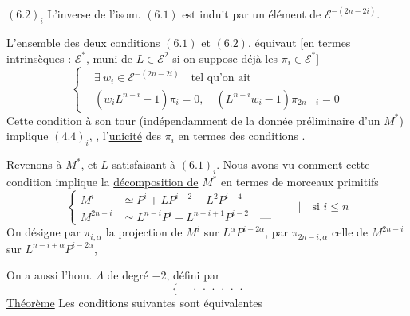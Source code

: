 $(6.2)_i$ L'inverse de l'isom. $(6.1)$ est  induit par un élément de $\mathcal E^{-(2n-2i)}$.

 L'ensemble des deux conditions $(6.1)$ et $(6.2)$, équivaut [en termes intrinsèques : $\mathcal E^*$, muni de $L\in\mathcal E^2$ si on suppose déjà les $\pi_i\in\mathcal E^*$]
\[
\left\{\begin{aligned}
&\exists\ w_i\in\mathcal E^{-(2n-2i)}\quad\text{tel qu'on ait}\\
&(w_iL^{n-i}-1)\pi_i=0,\quad(L^{n-i}w_i-1)\pi_{2n-i}=0
\end{aligned}\right.
\tag*{$(6.3.)_i$}
\]
Cette condition à son tour (indépendamment de la donnée préliminaire d'un $M^*$) implique $(4.4)_i$, ,  l'\uline{unicité} des $\pi_i$ en termes des conditions .

Revenons à $M^*$, et $L$ satisfaisant à $(6.1)_i$. Nous avons vu comment  cette condition implique la \uline{décomposition de} $M^*$ en termes  de morceaux primitifs
\[
\left\{\begin{aligned}
M^i&\simeq P^i+LP^{i-2}+L^2P^{i-4}\quad\text{---}\\
M^{2n-i}&\simeq L^{n-i}P^i+L^{n-i+1}P^{i-2}\quad\text{---}
\end{aligned}\right.\qquad\bigg|\quad\text{si }i\leq n
\tag{6.4}
\]
On désigne par $\pi_{i,\alpha}$ la projection de $M^i$ sur $L^\alpha P^{i-2\alpha}$, par $\pi_{2n-i,\alpha}$ celle de $M^{2n-i}$ sur $L^{n-i+\alpha}P^{i-2\alpha}$,

On a aussi l'hom. $\Lambda$ de degré $-2$, défini par
\[
\left\{\quad\cdot\ \cdot\ \cdot\ \cdot\ \cdot\ \cdot\right.
\tag{6.5}
\]
\uline{Théorème} Les conditions suivantes  sont équivalentes

